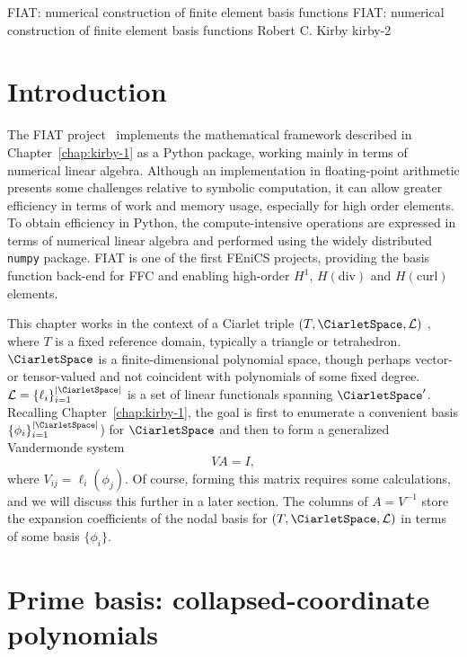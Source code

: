               {FIAT: numerical construction of finite element basis functions}
              {FIAT: numerical construction of finite element basis functions}
              {Robert C. Kirby}
              {kirby-2}

\section{Introduction}

The FIAT project~\citep{Kirby2004,Kirby2006} implements the mathematical
framework described in Chapter~\ref{chap:kirby-1} as a Python package,
working mainly in terms of numerical linear algebra.  Although an
implementation in floating-point arithmetic presents some challenges
relative to symbolic computation, it can allow greater efficiency in terms
of work and memory usage, especially for high order elements.  To obtain
efficiency in Python, the compute-intensive operations are expressed
in terms of numerical linear algebra and performed using the widely
distributed \texttt{numpy} package.  FIAT is one of the first FEniCS
projects, providing the basis function back-end for FFC and enabling
high-order $H^1$, $H(\mathrm{div})$ and $H(\mathrm{curl})$ elements.

This chapter works in the context of a Ciarlet triple
$(T,\CiarletSpace,\mathcal{L})$ \citep{Ciarlet2002}, where $T$
is a fixed reference domain, typically a triangle or tetrahedron.
$\CiarletSpace$ is a finite-dimensional polynomial space, though perhaps
vector- or tensor-valued and not coincident with polynomials of some
fixed degree.  $\mathcal{L} = \{ \ell_i \}_{i=1}^{|\CiarletSpace|}$ is
a set of linear functionals spanning $\CiarletSpace^\prime$.  Recalling
Chapter~\ref{chap:kirby-1}, the goal is first to enumerate a convenient
basis $\{ \phi_i \}_{i=1}^{|\CiarletSpace|}$) for $\CiarletSpace$ and
then to form a generalized Vandermonde system
\begin{equation}
  V A = I,
\end{equation}
where $V_{ij} = \ell_i( \phi_j)$.  Of course, forming this matrix requires
some calculations, and we will discuss this further in a later section.
The columns of $A = V^{-1}$ store the expansion coefficients of the
nodal basis for $(T,\CiarletSpace,\mathcal{L})$ in terms of some basis
$\{\phi_i\}$.

\section{Prime basis: collapsed-coordinate polynomials}


